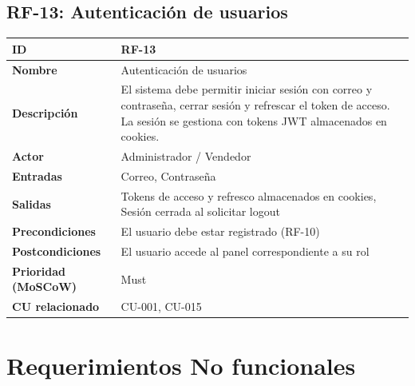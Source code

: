 \documentclass[12pt, a4paper]{article}
\begin{document}
\subsection{RF-13: Autenticación de usuarios}
\begin{center}
\renewcommand{\arraystretch}{1.4}
\begin{tabular}{|L{4cm}|L{12cm}|}
\hline
\textbf{ID} & RF-13 \\
\hline
\textbf{Nombre} & Autenticación de usuarios \\
\hline
\textbf{Descripción} & El sistema debe permitir iniciar sesión con correo y contraseña, cerrar sesión y refrescar el token de acceso. La sesión se gestiona con tokens JWT almacenados en cookies. \\
\hline
\textbf{Actor} & Administrador / Vendedor \\
\hline
\textbf{Entradas} & Correo, Contraseña \\
\hline
\textbf{Salidas} & Tokens de acceso y refresco almacenados en cookies, Sesión cerrada al solicitar logout \\
\hline
\textbf{Precondiciones} & El usuario debe estar registrado (RF-10) \\
\hline
\textbf{Postcondiciones} & El usuario accede al panel correspondiente a su rol \\
\hline
\textbf{Prioridad (MoSCoW)} & Must \\
\hline
\textbf{CU relacionado} & CU-001, CU-015 \\
\hline
\end{tabular}
\end{center}

\newpage

\section{Requerimientos No funcionales}
\end{document}
